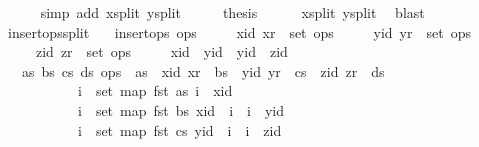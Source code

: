 \begin{isabellebody}
\ \ \ \ \isamarkupfalse%
\ {\isacharparenleft}simp\ add{\isacharcolon}\ x{\isacharunderscore}split\ y{\isacharunderscore}split{\isacharparenright}\isanewline
\ \ \isamarkupfalse%
\ \isamarkupfalse%
\ {\isacharquery}thesis\isanewline
\ \ \ \ \isamarkupfalse%
\ x{\isacharunderscore}split\ y{\isacharunderscore}split\ \isamarkupfalse%
\ blast\isanewline
{}\isamarkupfalse%
%
\endisatagproof
{\isafoldproof}%
%
\isadelimproof
\isanewline
%
\endisadelimproof
\isanewline
{}\isamarkupfalse%
\ insert{\isacharunderscore}ops{\isacharunderscore}split{\isacharunderscore}{}{\isacharcolon}\isanewline
\ \ \ {\isachardoublequoteopen}insert{\isacharunderscore}ops\ ops{\isachardoublequoteclose}\isanewline
\ \ \ \ \ {\isachardoublequoteopen}{\isacharparenleft}xid{\isacharcomma}\ xr{\isacharparenright}\ {\isasymin}\ set\ ops{\isachardoublequoteclose}\isanewline
\ \ \ \ \ {\isachardoublequoteopen}{\isacharparenleft}yid{\isacharcomma}\ yr{\isacharparenright}\ {\isasymin}\ set\ ops{\isachardoublequoteclose}\isanewline
\ \ \ \ \ {\isachardoublequoteopen}{\isacharparenleft}zid{\isacharcomma}\ zr{\isacharparenright}\ {\isasymin}\ set\ ops{\isachardoublequoteclose}\isanewline
\ \ \ \ \ {\isachardoublequoteopen}xid\ {\isacharless}\ yid{\isachardoublequoteclose}\ \ {\isachardoublequoteopen}yid\ {\isacharless}\ zid{\isachardoublequoteclose}\isanewline
\ \ \ {\isachardoublequoteopen}{\isasymexists}as\ bs\ cs\ ds{\isachardot}\ ops\ {\isacharequal}\ as\ {\isacharat}\ {\isacharbrackleft}{\isacharparenleft}xid{\isacharcomma}\ xr{\isacharparenright}{\isacharbrackright}\ {\isacharat}\ bs\ {\isacharat}\ {\isacharbrackleft}{\isacharparenleft}yid{\isacharcomma}\ yr{\isacharparenright}{\isacharbrackright}\ {\isacharat}\ cs\ {\isacharat}\ {\isacharbrackleft}{\isacharparenleft}zid{\isacharcomma}\ zr{\isacharparenright}{\isacharbrackright}\ {\isacharat}\ ds\ {\isasymand}\isanewline
\ \ \ \ \ \ \ \ \ \ \ {\isacharparenleft}{\isasymforall}i\ {\isasymin}\ set\ {\isacharparenleft}map\ fst\ as{\isacharparenright}{\isachardot}\ i\ {\isacharless}\ xid{\isacharparenright}\ {\isasymand}\isanewline
\ \ \ \ \ \ \ \ \ \ \ {\isacharparenleft}{\isasymforall}i\ {\isasymin}\ set\ {\isacharparenleft}map\ fst\ bs{\isacharparenright}{\isachardot}\ xid\ {\isacharless}\ i\ {\isasymand}\ i\ {\isacharless}\ yid{\isacharparenright}\ {\isasymand}\isanewline
\ \ \ \ \ \ \ \ \ \ \ {\isacharparenleft}{\isasymforall}i\ {\isasymin}\ set\ {\isacharparenleft}map\ fst\ cs{\isacharparenright}{\isachardot}\ yid\ {\isacharless}\ i\ {\isasymand}\ i\ {\isacharless}\ zid{\isacharparenright}\ {\isasymand}\isanewline

\end{isabellebody}
